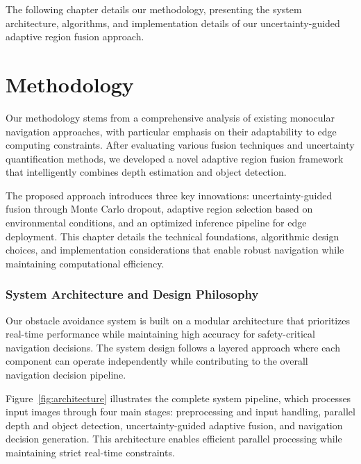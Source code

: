\documentclass[12pt,oneside]{book}
\newcommand{\figref}[1]{Figure~\ref{#1}}
\begin{document}
\vspace{12pt}
The following chapter details our methodology, presenting the system architecture, algorithms, and implementation details of our uncertainty-guided adaptive region fusion approach.

\chapter{Methodology}

Our methodology stems from a comprehensive analysis of existing monocular navigation approaches, with particular emphasis on their adaptability to edge computing constraints. After evaluating various fusion techniques and uncertainty quantification methods, we developed a novel adaptive region fusion framework that intelligently combines depth estimation and object detection.

The proposed approach introduces three key innovations: uncertainty-guided fusion through Monte Carlo dropout, adaptive region selection based on environmental conditions, and an optimized inference pipeline for edge deployment. This chapter details the technical foundations, algorithmic design choices, and implementation considerations that enable robust navigation while maintaining computational efficiency.
\subsection{System Architecture and Design Philosophy}

Our obstacle avoidance system is built on a modular architecture that prioritizes real-time performance while maintaining high accuracy for safety-critical navigation decisions. The system design follows a layered approach where each component can operate independently while contributing to the overall navigation decision pipeline.

\figref{fig:architecture} illustrates the complete system pipeline, which processes input images through four main stages: preprocessing and input handling, parallel depth and object detection, uncertainty-guided adaptive fusion, and navigation decision generation. This architecture enables efficient parallel processing while maintaining strict real-time constraints.
\end{document}

